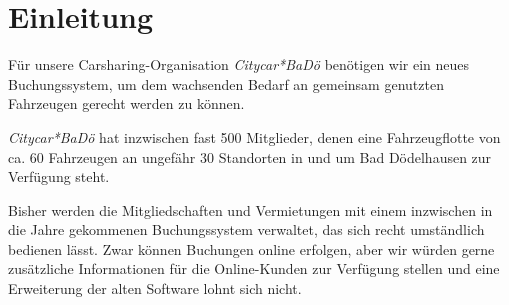 \chapter{Einleitung}

Für unsere Carsharing-Organisation \emph{Citycar*BaDö} benötigen wir ein neues Buchungssystem, um dem wachsenden Bedarf an gemeinsam genutzten Fahrzeugen gerecht werden zu können. 

\emph{Citycar*BaDö} hat inzwischen fast 500 Mitglieder, denen eine Fahrzeugflotte von ca. 60 Fahrzeugen an ungefähr 30 Standorten in und um Bad Dödelhausen zur Verfügung steht. 

Bisher werden die Mitgliedschaften und Vermietungen mit einem inzwischen in die Jahre gekommenen Buchungssystem verwaltet, das sich recht umständlich bedienen lässt. 
Zwar können Buchungen online erfolgen, aber wir würden gerne zusätzliche Informationen für die Online-Kunden zur Verfügung stellen und eine Erweiterung der alten Software lohnt sich nicht.

